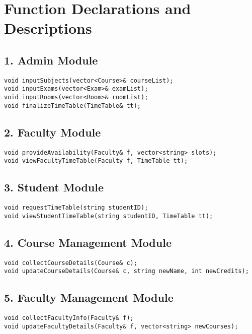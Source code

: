 \documentclass[12pt]{article}
\begin{document}
\section*{Function Declarations and Descriptions}

\subsection*{1. Admin Module}
\begin{lstlisting}[style=cppstyle]
void inputSubjects(vector<Course>& courseList);
void inputExams(vector<Exam>& examList);
void inputRooms(vector<Room>& roomList);
void finalizeTimeTable(TimeTable& tt);
\end{lstlisting}

\subsection*{2. Faculty Module}
\begin{lstlisting}[style=cppstyle]
void provideAvailability(Faculty& f, vector<string> slots);
void viewFacultyTimeTable(Faculty f, TimeTable tt);
\end{lstlisting}

\subsection*{3. Student Module}
\begin{lstlisting}[style=cppstyle]
void requestTimeTable(string studentID);
void viewStudentTimeTable(string studentID, TimeTable tt);
\end{lstlisting}

\subsection*{4. Course Management Module}
\begin{lstlisting}[style=cppstyle]
void collectCourseDetails(Course& c);
void updateCourseDetails(Course& c, string newName, int newCredits);
\end{lstlisting}

\subsection*{5. Faculty Management Module}
\begin{lstlisting}[style=cppstyle]
void collectFacultyInfo(Faculty& f);
void updateFacultyDetails(Faculty& f, vector<string> newCourses);
\end{lstlisting}
\end{document}
